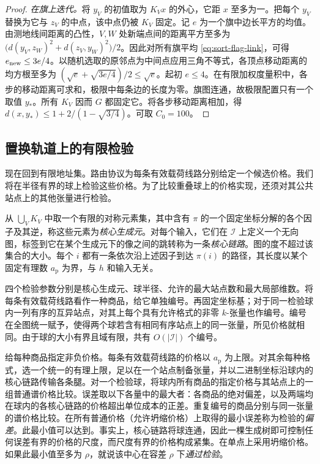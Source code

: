 \begin{proof}
\smallskip\noindent \emph{在旗上迭代。}将 $y_V$ 的初值取为 $K_Vx$ 的外心，它距 $x$ 至多为一。把每个 $y_V$ 替换为它与 $z_V$ 的中点，该中点仍被 $K_V$ 固定。记 $e$ 为一个旗中边长平方的均值。由测地线间距离的凸性，$V,W$ 处新端点间的距离平方至多为 $\bigl(d(y_V,z_W)^2+d(z_V,y_W)^2\bigr)/2$。因此对所有旗平均 \eqref{eq:sort-flag-link}，可得 $e_{\rm new}\le3e/4$。以随机选取的原邻点为中间点应用三角不等式，各顶点移动距离的均方根至多为 $(\sqrt e+\sqrt{3e/4})/2\le\sqrt e$。起初 $e\le4$。在有限加权度量积中，各步的移动距离可求和，极限中每条边的长度为零。旗图连通，故极限配置只有一个取值 $y_*$。所有 $K_V$ 因而 $G$ 都固定它。将各步移动距离相加，得 $d(x,y_*)\le1+2/(1-\sqrt{3/4})$。可取 $C_0=100$。\end{proof}

\subsection{置换轨道上的有限检验}

现在回到有限地址集。路由协议为每条有效载荷线路分别给定一个候选价格。我们将在半径有界的球上检验这些价格。为了比较重叠球上的价格实现，还须对其公共站点上的其他张量进行检验。

从 $\bigcup_V K_V$ 中取一个有限的对称元素集，其中含有 $\pi$ 的一个固定坐标分解的各个因子及其逆，称这些元素为\emph{核心生成元}。对每个输入，它们在 $\mathcal I$ 上定义一个无向图，标签到它在某个生成元下的像之间的跳转称为一条\emph{核心链路}。图的度不超过该集合的大小。每个 $i$ 都有一条依次沿上述因子到达 $\pi(i)$ 的路径，其长度以某个固定有理数 $a_{\mathrm p}$ 为界，与 $h$ 和输入无关。

四个检验参数分别是核心生成元、球半径、允许的最大站点数和最大局部维数。将每条有效载荷线路看作一种商品，给它单独编号。再固定坐标基；对于同一检验球内一列有序的互异站点，对其上每个具有允许格式的非零 $k$-张量也作编号。编号在全图统一赋予，使得两个球若含有相同有序站点上的同一张量，所见价格就相同。由于球的大小有界且域有限，共有 $O(|\mathcal I|)$ 个编号。

给每种商品指定非负价格。每条有效载荷线路的价格以 $a_{\mathrm p}$ 为上限。对其余每种格式，选一个统一的有理上限，足以在一个站点制备张量，并以二进制坐标沿球内的核心链路传输各条腿。对一个检验球，将球内所有商品的指定价格与其站点上的一组普通谱价格比较。误差取以下各量中的最大者：各商品的绝对偏差，以及两端均在球内的各核心链路的价格超出单位成本的正差。重复编号的商品分别与同一张量的谱价格比较。在所有普通价格（允许坍缩价格）上取得的最小误差称为检验的\emph{偏差}。此最小值可以达到。事实上，核心链路将球连通，因此一棵生成树即可控制任何误差有界的价格的尺度，而尺度有界的价格构成紧集。在单点上采用坍缩价格。如果此最小值至多为 $\rho$，就说该中心在容差 $\rho$ 下\emph{通过检验}。

